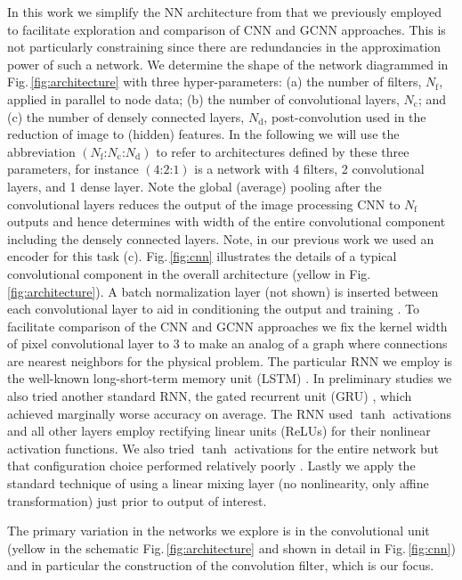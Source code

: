 \documentclass[12pt,reqno]{article}
\newcommand{\ADD}[1]{{#1}}
\newcommand{\fref}[1]{Fig.\,\ref{#1}}
\newcommand{\arch}[3]{({#1}\text{:}{#2}\text{:}{#3})}
\newcommand{\Nf}{N_\text{f}}
\newcommand{\Nc}{N_\text{c}}
\newcommand{\Nd}{N_\text{d}}
\begin{document}
In this work we simplify the NN architecture from that we previously employed to facilitate exploration and comparison of CNN and GCNN approaches.
This is not particularly constraining since there are redundancies in the approximation power of such a network.
We determine the shape of the network diagrammed in \fref{fig:architecture} with three hyper-parameters:
(a) the number of filters, $\Nf$, applied in parallel to node data;
(b) the number of convolutional layers, $\Nc$;
and
(c) the number of densely connected layers, $\Nd$, post-convolution used in the reduction of image to (hidden) features.
In the following we will use the abbreviation $\arch{\Nf}{\Nc}{\Nd}$ to refer to architectures defined by these three parameters, for instance $\arch{4}{2}{1}$ is a network with 4 filters, 2 convolutional layers, and 1 dense layer.
Note the global (average) pooling after the convolutional layers reduces the output of the image processing CNN to $\Nf$ outputs and hence determines with width of the entire convolutional component including the densely connected layers.
Note, in our previous work \cite{frankel2019oligocrystals} we used an encoder for this task (c).
\ADD{
\fref{fig:cnn} illustrates the details of a typical convolutional component in the overall architecture (yellow in \fref{fig:architecture}).
}
A batch normalization layer (not shown) is inserted between each convolutional layer to aid in conditioning the output and training \cite{bjorck2018understanding}.
To facilitate comparison of the CNN and GCNN approaches we fix the kernel width of pixel convolutional layer to 3 to make an analog of a graph where connections are nearest neighbors for the physical problem.
The particular RNN we employ is the well-known long-short-term memory unit (LSTM) \cite{hochreiter1997long}.
In preliminary studies we also tried another standard RNN, the gated recurrent unit (GRU) \cite{cho2014learning}, which achieved marginally worse accuracy on average.
The RNN used $\tanh$ activations and all other layers employ rectifying linear units (ReLUs) for their nonlinear activation functions.
We also tried $\tanh$ activations for the entire network but that configuration choice performed relatively poorly \cite{glorot2010understanding,glorot2011deep}.
Lastly we apply the standard technique of using a linear mixing layer (no nonlinearity, only affine transformation) just prior to output of interest.

The primary variation in the networks we explore is in the convolutional unit (yellow in the schematic \fref{fig:architecture} and shown in detail in \fref{fig:cnn}) and in particular the construction of the convolution filter, which is our focus.
\end{document}
